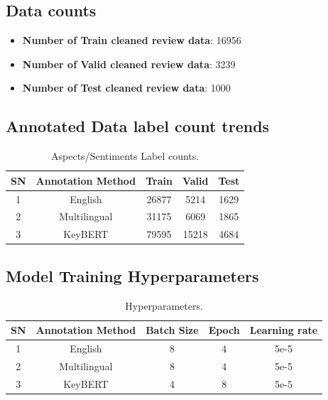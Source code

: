 \subsection{Data counts}
\begin{itemize}
\item \textbf{Number of Train cleaned review data}: 16956
\item \textbf{Number of Valid cleaned review data}: 3239
\item \textbf{Number of Test cleaned review data}: 1000
\end{itemize}
\subsection{Annotated Data label count trends}
\begin{table}[h!]
\centering
 \begin{tabular}{c c c c c} 
 \hline
 SN & Annotation Method & Train & Valid & Test \\ [0.5ex] 
 \hline
 1 & English & 26877 & 5214 & 1629 \\ 
 2 & Multilingual & 31175 & 6069 & 1865 \\
 3 & KeyBERT & 79595 & 15218 & 4684 \\ [1ex] 
 \hline
 \end{tabular}
 \caption{\label{tab:mytab1} Aspects/Sentiments Label counts.}
\end{table}
\subsection{Model Training Hyperparameters}
\begin{table}[h!]
\centering
 \begin{tabular}{c c c c c} 
 \hline
 SN & Annotation Method & Batch Size & Epoch & Learning rate \\ [0.5ex] 
 \hline
 1 & English & 8 & 4 & 5e-5 \\ 
 2 & Multilingual & 8 & 4 & 5e-5 \\
 3 & KeyBERT & 4 & 8 & 5e-5 \\ [1ex] 
 \hline
 \end{tabular}
 \caption{\label{tab:mytab2} Hyperparameters.}
\end{table}
